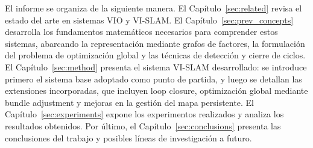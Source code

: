 El informe se organiza de la siguiente manera. El Capítulo~\ref{sec:related} revisa el estado del arte en sistemas VIO y VI-SLAM. El Capítulo~\ref{sec:prev_concepts} desarrolla los fundamentos matemáticos necesarios para comprender estos sistemas, abarcando la representación mediante grafos de factores, la formulación del problema de optimización global y las técnicas de detección y cierre de ciclos. El Capítulo~\ref{sec:method} presenta el sistema VI-SLAM desarrollado: se introduce primero el sistema base adoptado como punto de partida, y luego se detallan las extensiones incorporadas, que incluyen loop closure, optimización global mediante bundle adjustment y mejoras en la gestión del mapa persistente. El Capítulo~\ref{sec:experiments} expone los experimentos realizados y analiza los resultados obtenidos. Por último, el Capítulo~\ref{sec:conclusions} presenta las conclusiones del trabajo y posibles líneas de investigación a futuro.
